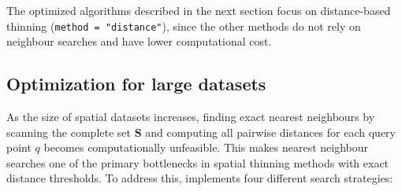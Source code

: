 The optimized algorithms described in the next section focus on distance-based thinning (\texttt{method\ =\ "distance"}), since the other methods do not rely on neighbour searches and have lower computational cost.

\subsection{Optimization for large datasets}\label{optimization-for-large-datasets}

As the size of spatial datasets increases, finding exact nearest neighbours by scanning the complete set \(\mathbf{S}\) and computing all pairwise distances for each query point \(q\) becomes computationally unfeasible. This makes nearest neighbour searches one of the primary bottlenecks in spatial thinning methods with exact distance thresholds. To address this,  implements four different search strategies:

